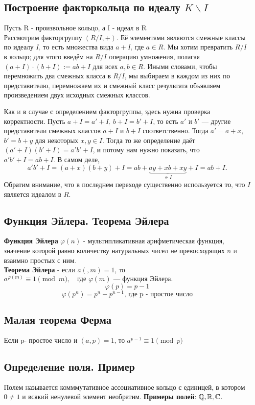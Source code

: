 \subsection{Построение факторкольца по идеалу $K\backslash I$}
Пусть R - произвольное кольцо, а I - идеал в R \\
Рассмотрим факторгруппу $(R/I,+)$. Её элементами являются смежные классы по идеалу $I$, то есть множества вида $a + I$, где $a \in R$. Мы хотим превратить $R/I$ в кольцо; для этого введём на $R/I$ операцию умножения, полагая $(a + I) \cdot (b + I) := ab + I$ для всех $a,b \in R$. Иными словами, чтобы перемножить два смежных класса в $R/I$, мы выбираем в каждом из них по представителю, перемножаем их и смежный класс результата объявляем произведением двух исходных смежных классов.

Как и в случае с определением факторгруппы, здесь нужна проверка корректности. Пусть $a + I = a' + I$, $b + I = b' + I$, то есть $a'$ и $b'$ --- другие представители смежных классов $a + I$ и $b + I$ соответственно. Тогда $a' = a + x$, $b' = b + y$ для некоторых $x,y \in I$. Тогда то же определение даёт $(a' + I)(b' + I) = a'b' + I$, и потому нам нужно показать, что $a'b' + I = ab + I$. В самом деле,
\[
a'b' + I = (a + x)(b + y) + I = ab + \underbrace{ay + xb + xy}_{\in I} + I = ab + I.
\]
Обратим внимание, что в последнем переходе существенно используется то, что $I$ является идеалом в $R$.\\
\subsection{Функция Эйлера. Теорема Эйлера} 
\textbf{Функция Эйлера}  $\varphi(n)$ - мультипликативная арифметическая функция, значение которой равно количеству натуральных чисел не превосходящих $n$ и взаимно простых с ним.\\
\textbf{Теорема Эйлера} - если $a(,m) = 1$, то $a^{\varphi(m)} \equiv 1 \pmod{m}, \quad \text{где } \varphi(m) \text{ — функция Эйлера.}$\\
$$\varphi(p) = p-1$$
$$\varphi(p^n) =p^n-p^{n-1}\text{,  где p - простое число}$$
\subsection{Малая теорема Ферма} 
Если p- простое число и $(a,p)=1$, то $a^{p-1} \equiv 1\pmod{p}$
\subsection{Определение поля. Пример}
Полем называется комммутативное ассоциативное кольцо с единицей, в котором $0\ne 1$ и всякий ненулевой элемент необратим.
\textbf{Примеры полей}: $\mathbb{Q}, \mathbb{R},\mathbb{C}$.
